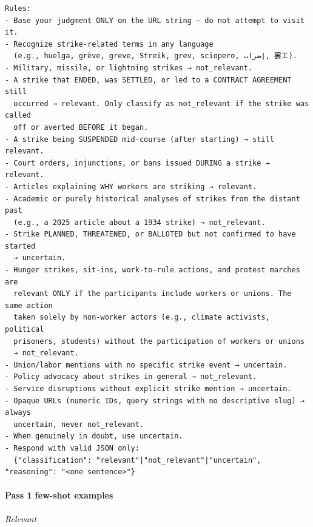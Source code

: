 \documentclass[
  11pt,
]{article}
\begin{document}
\begin{verbatim}
Rules:
- Base your judgment ONLY on the URL string — do not attempt to visit it.
- Recognize strike-related terms in any language
  (e.g., huelga, grève, greve, Streik, grev, sciopero, إضراب, 罢工).
- Military, missile, or lightning strikes → not_relevant.
- A strike that ENDED, was SETTLED, or led to a CONTRACT AGREEMENT still
  occurred → relevant. Only classify as not_relevant if the strike was called
  off or averted BEFORE it began.
- A strike being SUSPENDED mid-course (after starting) → still relevant.
- Court orders, injunctions, or bans issued DURING a strike → relevant.
- Articles explaining WHY workers are striking → relevant.
- Academic or purely historical analyses of strikes from the distant past
  (e.g., a 2025 article about a 1934 strike) → not_relevant.
- Strike PLANNED, THREATENED, or BALLOTED but not confirmed to have started
  → uncertain.
- Hunger strikes, sit-ins, work-to-rule actions, and protest marches are
  relevant ONLY if the participants include workers or unions. The same action
  taken solely by non-worker actors (e.g., climate activists, political
  prisoners, students) without the participation of workers or unions
  → not_relevant.
- Union/labor mentions with no specific strike event → uncertain.
- Policy advocacy about strikes in general → not_relevant.
- Service disruptions without explicit strike mention → uncertain.
- Opaque URLs (numeric IDs, query strings with no descriptive slug) → always
  uncertain, never not_relevant.
- When genuinely in doubt, use uncertain.
- Respond with valid JSON only:
  {"classification": "relevant"|"not_relevant"|"uncertain", "reasoning": "<one sentence>"}
\end{verbatim}

\paragraph{Pass 1 few-shot examples}\label{pass-1-few-shot-examples}

\emph{Relevant}
\end{document}
